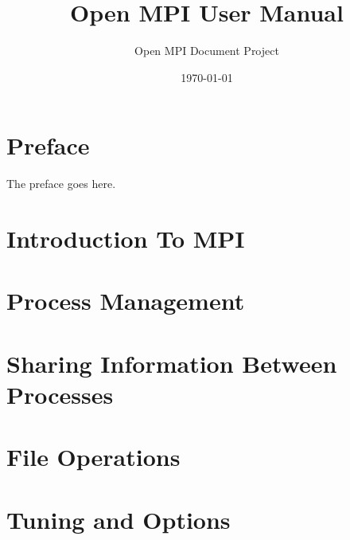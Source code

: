 \documentclass[12pt,twoside]{book}
\begin{document}
\frontmatter

\title{Open MPI User Manual}
\author{Open MPI Document Project}
\date{\today}
\maketitle

\tableofcontents
\lstlistoflistings

\chapter{Preface}

The preface goes here.

\mainmatter

\chapter{Introduction To MPI}


\chapter{Process Management}


\chapter{Sharing Information Between Processes}


\chapter{File Operations}


\chapter{Tuning and Options}


\backmatter
\end{document}
